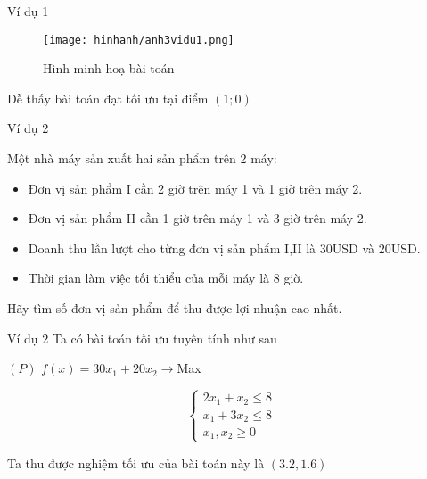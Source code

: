 \documentclass{beamer}
\begin{document}
\begin{frame}{Ví dụ 1}
    \begin{center}
        \begin{figure}[ht]
            \begin{center}

            \texttt{[image: hinhanh/anh3vidu1.png]}  
            
            Hình minh hoạ bài toán
            \end{center}
      \end{figure}
      Dễ thấy bài toán đạt tối ưu tại điểm $(1;0)$
      \end{center}
      
\end{frame}


\begin{frame}{Ví dụ 2}

Một nhà máy sản xuất hai sản phẩm trên 2 máy:

\begin{itemize}
    \item Đơn vị sản phẩm I cần 2 giờ trên máy 1 và 1 giờ trên máy 2.
    \item Đơn vị sản phẩm II cần 1 giờ trên máy 1 và 3 giờ trên máy 2.
    \item Doanh thu lần lượt cho từng đơn vị sản phẩm I,II là 30USD và 20USD.
    \item Thời gian làm việc tối thiểu của mỗi máy là 8 giờ.
\end{itemize}
Hãy tìm số đơn vị sản phẩm để thu được lợi nhuận cao nhất.

\end{frame}
 \begin{frame}{Ví dụ 2}
     Ta có bài toán tối ưu tuyến tính như sau
     \begin{center}
            $\left(P\right)$ $f(x)=30x_1+20x_2 \longrightarrow$Max
     \end{center}
  \[\left\{\begin{aligned}
      2x_1+x_2\leq 8\\
      x_1+3x_2\leq 8\\
      x_1,x_2\geq 0
  \end{aligned}\right.\]
\begin{center}
    Ta thu được nghiệm tối ưu của bài toán này là $(3.2,1.6)$ 
     
\end{center}

 \end{frame}
    
\end{document}
